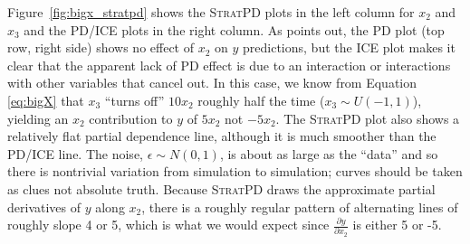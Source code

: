 \documentclass[12pt]{article}
\newcommand{\figref}[1]{Figure~\ref{#1}}
\newcommand{\spd}{\fontfamily{cmr}\textsc{\small StratPD}}
\begin{document}
\noindent \figref{fig:bigx_stratpd} shows the \spd{} plots in the left column for $x_2$ and $x_3$ and the PD/ICE plots in the right column. As \cite{ICE} points out, the PD plot (top row, right side) shows no effect of $x_2$ on $y$ predictions, but the ICE plot makes it clear that the apparent lack of PD effect is due to an interaction or interactions with other variables that cancel out. In this case, we know from Equation \eqref{eq:bigX} that $x_3$ ``turns off'' $10 x_2$ roughly half the time ($x_3 \sim U(-1,1)$), yielding an $x_2$ contribution to $y$ of $5 x_2$ not $-5 x_2$. The \spd{} plot also shows a relatively flat partial dependence line, although it is much smoother than the PD/ICE line. The noise, $\epsilon \sim N(0,1)$, is about as large as the ``data'' and so there is nontrivial variation from simulation to simulation; curves should be taken as clues not absolute truth. Because \spd{} draws the approximate partial derivatives of $y$ along $x_2$, there is a roughly regular pattern of alternating lines of roughly slope 4 or 5, which is what we would expect since $\frac{\partial y}{\partial x_2}$ is either 5 or -5.
\end{document}
